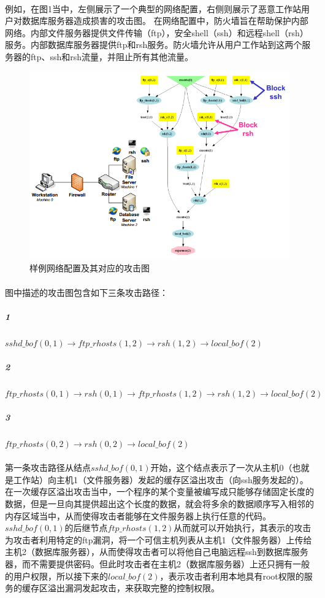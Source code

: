 \documentclass[12pt,a4paper]{article}
\begin{document}
\paragraph{}
例如，在图1当中，左侧展示了一个典型的网络配置，右侧则展示了恶意工作站用户对数据库服务器造成损害的攻击图。 在网络配置中，防火墙旨在帮助保护内部网络。内部文件服务器提供文件传输（ftp），安全shell（ssh）和远程shell（rsh）服务。内部数据库服务器提供ftp和rsh服务。防火墙允许从用户工作站到这两个服务器的ftp、ssh和rsh流量，并阻止所有其他流量。
\begin{figure}[!htp]
	\centering
	\includegraphics[scale=0.5]{images/example.png} 
	\caption{样例网络配置及其对应的攻击图}
\end{figure}

\paragraph{}
图中描述的攻击图包含如下三条攻击路径：
\subparagraph{1}$sshd\_bof(0,1)\rightarrow ftp\_rhosts(1,2)\rightarrow rsh(1,2)\rightarrow local\_bof(2)$
\subparagraph{2}$ftp\_rhosts(0,1)\rightarrow rsh(0,1)\rightarrow ftp\_rhosts(1,2)\rightarrow rsh(1,2)\rightarrow local\_bof(2)$
\subparagraph{3}$ftp\_rhosts(0,2)\rightarrow rsh(0,2)\rightarrow local\_bof(2)$

\paragraph{}
第一条攻击路径从结点$sshd\_bof(0,1)$开始，这个结点表示了一次从主机0（也就是工作站）向主机1（文件服务器）发起的缓存区溢出攻击（向ssh服务发起的）。在一次缓存区溢出攻击当中，一个程序的某个变量被编写成只能够存储固定长度的数据，但是一旦向其提供超出这个长度的数据，就会将多余的数据顺序写入相邻的内存区域当中，从而使得攻击者能够在文件服务器上执行任意的代码。$sshd\_bof(0,1)$的后继节点$ftp\_rhosts(1,2)$从而就可以开始执行，其表示的攻击为攻击者利用特定的ftp漏洞，将一个可信主机列表从主机1（文件服务器）上传给主机2（数据库服务器），从而使得攻击者可以将他自己电脑远程ssh到数据库服务器，而不需要提供密码。但此时攻击者在主机2（数据库服务器）上还只拥有一般的用户权限，所以接下来的$local\_bof(2)$，表示攻击者利用本地具有root权限的服务的缓存区溢出漏洞发起攻击，来获取完整的控制权限。
\end{document}
